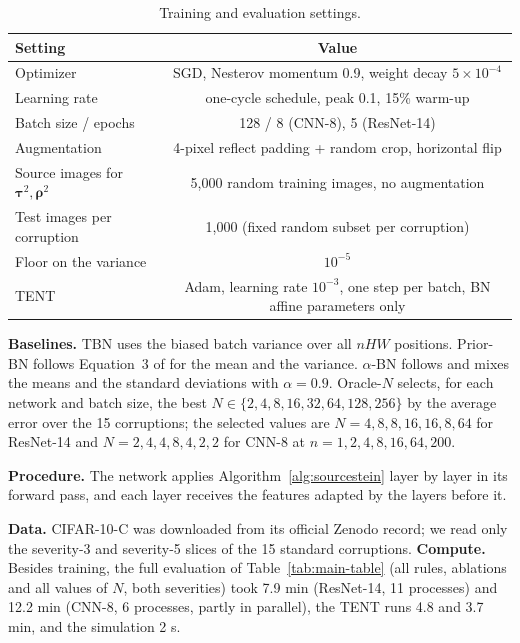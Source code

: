 \begin{table}[ht]
\centering
\caption{Training and evaluation settings.}
\label{tab:hyper}
\begin{tabular}{l|c}
\toprule
\textbf{Setting} & \textbf{Value} \\
\midrule
Optimizer & SGD, Nesterov momentum 0.9, weight decay $5 \times 10^{-4}$ \\
Learning rate & one-cycle schedule, peak 0.1, 15\% warm-up \\
Batch size / epochs & 128 / 8 (CNN-8), 5 (ResNet-14) \\
Augmentation & 4-pixel reflect padding + random crop, horizontal flip \\
Source images for $\boldsymbol{\tau}^2, \boldsymbol{\rho}^2$ & 5,000 random training images, no augmentation \\
Test images per corruption & 1,000 (fixed random subset per corruption) \\
Floor on the variance & $10^{-5}$ \\
TENT & Adam, learning rate $10^{-3}$, one step per batch, BN affine parameters only \\
\bottomrule
\end{tabular}
\end{table}

\textbf{Baselines.} TBN uses the biased batch variance over all $nHW$ positions. Prior-BN follows Equation~3 of \citet{BN-Adapt} for the mean and the variance. $\alpha$-BN follows \citet{AlphaBN} and mixes the means and the standard deviations with $\alpha = 0.9$. Oracle-$N$ selects, for each network and batch size, the best $N \in \{2, 4, 8, 16, 32, 64, 128, 256\}$ by the average error over the 15 corruptions; the selected values are $N = 4, 8, 8, 16, 16, 8, 64$ for ResNet-14 and $N = 2, 4, 4, 8, 4, 2, 2$ for CNN-8 at $n = 1, 2, 4, 8, 16, 64, 200$.

\textbf{Procedure.} The network applies Algorithm~\ref{alg:sourcestein} layer by layer in its forward pass, and each layer receives the features adapted by the layers before it.



\textbf{Data.} CIFAR-10-C \cite{CIFAR10-C} was downloaded from its official Zenodo record; we read only the severity-3 and severity-5 slices of the 15 standard corruptions. \textbf{Compute.} Besides training, the full evaluation of Table~\ref{tab:main-table} (all rules, ablations and all values of $N$, both severities) took 7.9 min (ResNet-14, 11 processes) and 12.2 min (CNN-8, 6 processes, partly in parallel), the TENT runs 4.8 and 3.7 min, and the simulation 2 s.

